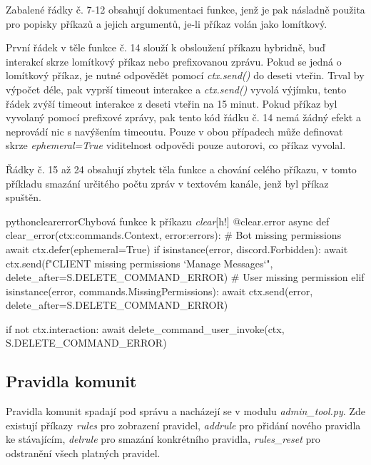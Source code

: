 \documentclass[
  program=inf,
biblatex=false,
sourcecodes=true,
joinlists=true,
  figures=true,
  tables=true,
  glossaries=true,
  index=false
]{kidiplom}
\begin{document}
Zabalené řádky č. 7-12 obsahují dokumentaci funkce, jenž je
pak násladně použita pro popisky příkazů a jejich argumentů, je-li příkaz volán jako lomítkový.

První řádek v těle funkce č. 14 slouží k obsloužení příkazu hybridně, buď interakcí skrze lomítkový příkaz
nebo prefixovanou zprávu. Pokud se jedná o lomítkový příkaz, je nutné odpovědět pomocí {\it ctx.send()} do deseti vteřin. 
Trval by výpočet déle, pak vyprší timeout interakce a {\it ctx.send()} vyvolá výjímku, tento řádek zvýší
timeout interakce z deseti vteřin na 15 minut. Pokud příkaz byl vyvolaný pomocí prefixové zprávy, pak tento kód řádku č. 14
nemá žádný efekt a neprovádí nic s navýšením timeoutu. Pouze v obou případech může definovat skrze {\it ephemeral=True} viditelnost
odpovědi pouze autorovi, co příkaz vyvolal.

Řádky č. 15 až 24 obsahují zbytek těla funkce a chování celého příkazu, v tomto příkladu 
smazání určitého počtu zpráv v textovém kanále, jenž byl příkaz spuštěn.


\begin{kicode}{python}{clearerror}{Chybová funkce k příkazu {\it clear}}[h!]
  @clear.error
  async def clear_error(ctx:commands.Context, error:errors):
      # Bot missing permissions
      await ctx.defer(ephemeral=True)
      if isinstance(error, discord.Forbidden):
          await ctx.send(f"{CLIENT} missing permissions `Manage Messages`",
                          delete_after=S.DELETE_COMMAND_ERROR)
      # User missing permission
      elif isinstance(error, commands.MissingPermissions):
          await ctx.send(error, delete_after=S.DELETE_COMMAND_ERROR)
      
      if not ctx.interaction:
          await delete_command_user_invoke(ctx, S.DELETE_COMMAND_ERROR)
\end{kicode}

\newpage
\subsection{Pravidla komunit}
Pravidla komunit spadají pod správu a nacházejí se v modulu {\it admin\_tool.py}. Zde
existují příkazy {\it rules} pro zobrazení pravidel, {\it addrule} pro přidání nového pravidla
ke stávajícím, {\it delrule} pro smazání konkrétního pravidla, {\it rules\_reset} pro odstranění
všech platných pravidel.
\end{document}
